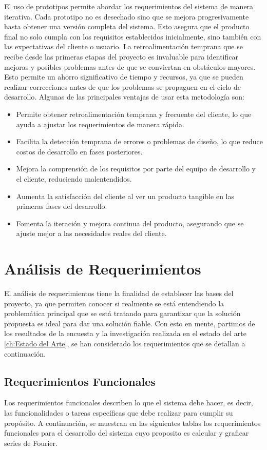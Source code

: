 El uso de prototipos permite abordar los requerimientos del sistema de manera iterativa. Cada prototipo no es desechado sino que se mejora progresivamente hasta obtener una versión completa del sistema. Esto asegura que el producto final no solo cumpla con los requisitos establecidos inicialmente, sino también con las expectativas del cliente o usuario. \newline 
La retroalimentación temprana que se recibe desde las primeras etapas del proyecto es invaluable para identificar mejoras y posibles problemas antes de que se conviertan en obstáculos mayores. Esto permite un ahorro significativo de tiempo y recursos, ya que se pueden realizar correcciones antes de que los problemas se propaguen en el ciclo de desarrollo. Algunas de las principales ventajas de usar esta metodología son: \newline 
\begin{itemize}
	\item Permite obtener retroalimentación temprana y frecuente del cliente, lo que ayuda a ajustar los requerimientos de manera rápida.
	\item Facilita la detección temprana de errores o problemas de diseño, lo que reduce costos de desarrollo en fases posteriores.
	\item Mejora la comprensión de los requisitos por parte del equipo de desarrollo y el cliente, reduciendo malentendidos.
	\item Aumenta la satisfacción del cliente al ver un producto tangible en las primeras fases del desarrollo.
	\item Fomenta la iteración y mejora continua del producto, asegurando que se ajuste mejor a las necesidades reales del cliente.
\end{itemize}


\section{Análisis de Requerimientos}
El análisis de requerimientos tiene la finalidad de establecer las bases del proyecto, ya que permiten conocer si realmente se está entendiendo la problemática principal que se está tratando para garantizar que la solución propuesta es ideal para dar una solución fiable. 
Con esto en mente, partimos de los resultados de la encuesta y la investigación realizada en el estado del arte \ref{ch:Estado del Arte}, se han considerado los requerimientos que se detallan a continuación.
\subsection{Requerimientos Funcionales}
Los requerimientos funcionales describen lo que el sistema debe hacer, es decir, las funcionalidades o tareas específicas que debe realizar para cumplir su propósito. A continuación, se muestran en las siguientes tablas los requerimientos funcionales para el desarrollo del sistema cuyo proposito es calcular y graficar series de Fourier.

